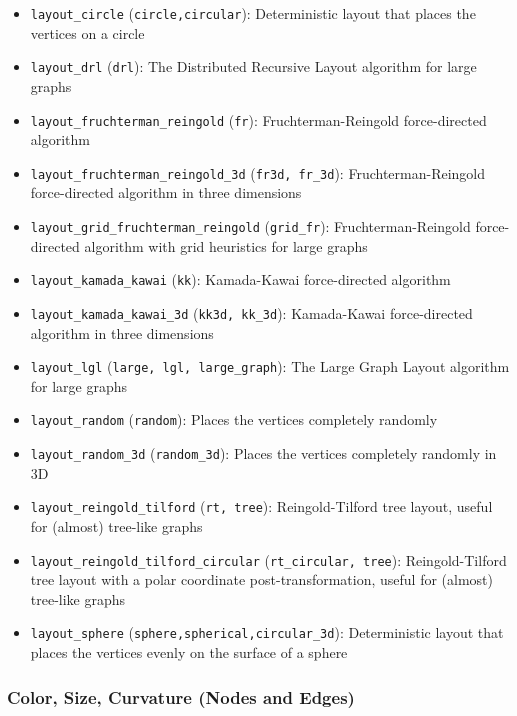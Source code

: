 \documentclass[11pt]{article}
\providecommand{\tightlist}{%
      \setlength{\itemsep}{0pt}\setlength{\parskip}{0pt}}
\begin{document}
\begin{itemize}
\tightlist
\item
  \texttt{layout\_circle} (\texttt{circle,circular}): Deterministic
  layout that places the vertices on a circle
\item
  \texttt{layout\_drl} (\texttt{drl}): The Distributed Recursive Layout
  algorithm for large graphs
\item
  \texttt{layout\_fruchterman\_reingold} (\texttt{fr}):
  Fruchterman-Reingold force-directed algorithm
\item
  \texttt{layout\_fruchterman\_reingold\_3d} (\texttt{fr3d,\ fr\_3d}):
  Fruchterman-Reingold force-directed algorithm in three dimensions
\item
  \texttt{layout\_grid\_fruchterman\_reingold} (\texttt{grid\_fr}):
  Fruchterman-Reingold force-directed algorithm with grid heuristics for
  large graphs
\item
  \texttt{layout\_kamada\_kawai} (\texttt{kk}): Kamada-Kawai
  force-directed algorithm
\item
  \texttt{layout\_kamada\_kawai\_3d} (\texttt{kk3d,\ kk\_3d}):
  Kamada-Kawai force-directed algorithm in three dimensions
\item
  \texttt{layout\_lgl} (\texttt{large,\ lgl,\ large\_graph}): The Large
  Graph Layout algorithm for large graphs
\item
  \texttt{layout\_random} (\texttt{random}): Places the vertices
  completely randomly
\item
  \texttt{layout\_random\_3d} (\texttt{random\_3d}): Places the vertices
  completely randomly in 3D
\item
  \texttt{layout\_reingold\_tilford} (\texttt{rt,\ tree}):
  Reingold-Tilford tree layout, useful for (almost) tree-like graphs
\item
  \texttt{layout\_reingold\_tilford\_circular}
  (\texttt{rt\_circular,\ tree}): Reingold-Tilford tree layout with a
  polar coordinate post-transformation, useful for (almost) tree-like
  graphs
\item
  \texttt{layout\_sphere} (\texttt{sphere,spherical,circular\_3d}):
  Deterministic layout that places the vertices evenly on the surface of
  a sphere
\end{itemize}

    \hypertarget{color-size-curvature-nodes-and-edges}{%
\subsubsection{Color, Size, Curvature (Nodes and
Edges)}\label{color-size-curvature-nodes-and-edges}}
\end{document}
